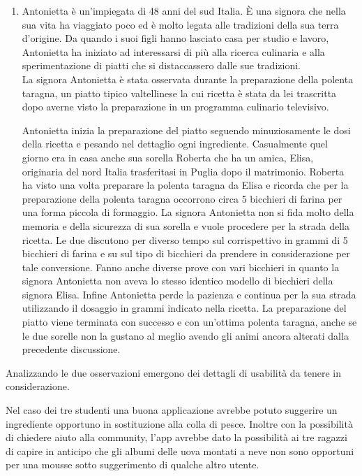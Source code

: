 \begin{enumerate}
\item Antonietta è un'impiegata di 48 anni del sud Italia. È una signora che
nella sua vita ha viaggiato poco ed è molto legata alle tradizioni della
sua terra d'origine. Da quando i suoi figli hanno lasciato casa per
studio e lavoro, Antonietta ha iniziato ad interessarsi di più alla
ricerca culinaria e alla sperimentazione di piatti che si distaccassero
dalle sue tradizioni.\\

La signora Antonietta è stata osservata durante la preparazione della polenta taragna, un
piatto tipico valtellinese la cui ricetta è stata da lei trascritta dopo
averne visto la preparazione in un programma culinario televisivo.

Antonietta inizia la preparazione del piatto seguendo minuziosamente le
dosi della ricetta e pesando nel dettaglio ogni ingrediente. Casualmente
quel giorno era in casa anche sua sorella Roberta che ha un amica,
Elisa, originaria del nord Italia trasferitasi in Puglia dopo il matrimonio.
Roberta ha visto una volta preparare la polenta taragna da Elisa e
ricorda che per la preparazione della polenta taragna occorrono circa 5
bicchieri di farina per una forma piccola di formaggio. La signora
Antonietta non si fida molto della memoria e della sicurezza di sua sorella
e vuole procedere per la strada della ricetta. Le due discutono per
diverso tempo sul corrispettivo in grammi di 5 bicchieri di farina e su
sul tipo di bicchieri da prendere in considerazione per tale
conversione. Fanno anche diverse prove con vari bicchieri in quanto la
signora Antonietta non aveva lo stesso identico modello di bicchieri della
signora Elisa. Infine Antonietta perde la pazienza e continua per la sua
strada utilizzando il dosaggio in grammi indicato nella ricetta. La
preparazione del piatto viene terminata con successo e con un'ottima
polenta taragna, anche se le due sorelle non la gustano al meglio avendo
gli animi ancora alterati dalla precedente discussione.
\end{enumerate}

Analizzando le due osservazioni emergono dei dettagli di usabilità da
tenere in considerazione.

Nel caso dei tre studenti una buona
applicazione avrebbe potuto suggerire un ingrediente opportuno in
sostituzione alla colla di pesce. Inoltre con la possibilità di chiedere
aiuto alla community, l'app avrebbe dato la possibilità ai tre ragazzi di capire in
anticipo che gli albumi delle uova montati a neve non sono opportuni per
una mousse sotto suggerimento di qualche altro utente.

